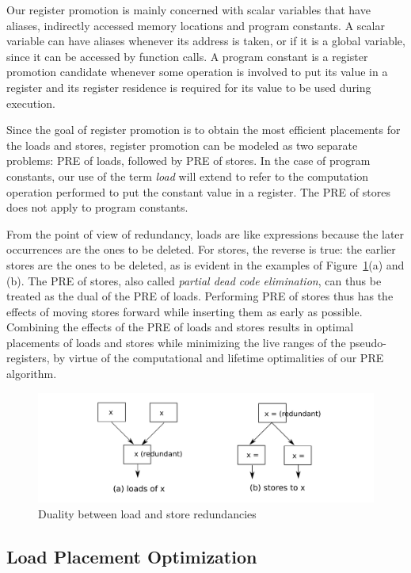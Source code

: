 Our register promotion is
mainly concerned with scalar variables that have aliases, indirectly accessed
memory locations and program constants.  A scalar variable can have aliases
whenever its address is taken, or if it is a global variable, since it can
be accessed by function calls.  A program constant is a register promotion
candidate whenever some operation is involved to put its value in a register and
its register residence is required for its value to be used during execution.

Since the goal of
register promotion is to obtain the most efficient placements for the loads and
stores, register promotion can be modeled as two separate problems: PRE of 
loads, followed by PRE of stores.  In the case of program constants, our use of
the term \emph{load} will extend to refer to the computation operation performed
to put the constant value in a register.  The PRE of stores does not apply
to program constants.

From the point of view of redundancy, loads are like expressions because the
later occurrences are the ones to be deleted.  For stores, the reverse is true:
the earlier stores are the ones to be deleted, as is evident in the examples
of Figure~\ref{fig: load-store-dual}(a) and (b).  The PRE of stores,
also called \emph{partial dead code elimination}, can thus be treated as the
dual of the PRE of loads.  Performing PRE of stores thus has the effects
of moving stores forward while inserting them as early as possible.  
Combining the effects of the PRE of loads and stores results in optimal
placements of loads and stores while minimizing the live ranges of the
pseudo-registers, by virtue of the computational and lifetime optimalities
of our PRE algorithm.

\begin{figure}
\centering
\includegraphics[scale=0.55]{fig-load-store-dual.pdf}
\caption{Duality between load and store redundancies}
\label{fig: load-store-dual}
\end{figure}

\subsection{Load Placement Optimization}

